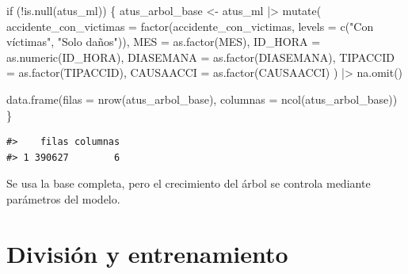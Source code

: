 \documentclass[
  spanish,
  10.5pt,
  letterpaper,
  openany,
  headings=big]{scrbook}
\newenvironment{Shaded}{}{}
\newcommand{\AttributeTok}[1]{\textcolor[rgb]{0.84,0.23,0.29}{#1}}
\newcommand{\ControlFlowTok}[1]{\textcolor[rgb]{0.84,0.23,0.29}{#1}}
\newcommand{\FunctionTok}[1]{\textcolor[rgb]{0.44,0.26,0.76}{#1}}
\newcommand{\NormalTok}[1]{\textcolor[rgb]{0.14,0.16,0.18}{#1}}
\newcommand{\OtherTok}[1]{\textcolor[rgb]{0.44,0.26,0.76}{#1}}
\newcommand{\SpecialCharTok}[1]{\textcolor[rgb]{0.00,0.36,0.77}{#1}}
\newcommand{\StringTok}[1]{\textcolor[rgb]{0.01,0.18,0.38}{#1}}
\begin{document}
\begin{Shaded}
\begin{Highlighting}[]
\ControlFlowTok{if}\NormalTok{ (}\SpecialCharTok{!}\FunctionTok{is.null}\NormalTok{(atus\_ml)) \{}
\NormalTok{  atus\_arbol\_base }\OtherTok{\textless{}{-}}\NormalTok{ atus\_ml }\SpecialCharTok{|\textgreater{}}
    \FunctionTok{mutate}\NormalTok{(}
      \AttributeTok{accidente\_con\_victimas =} \FunctionTok{factor}\NormalTok{(accidente\_con\_victimas, }\AttributeTok{levels =} \FunctionTok{c}\NormalTok{(}\StringTok{"Con víctimas"}\NormalTok{, }\StringTok{"Solo daños"}\NormalTok{)),}
      \AttributeTok{MES =} \FunctionTok{as.factor}\NormalTok{(MES),}
      \AttributeTok{ID\_HORA =} \FunctionTok{as.numeric}\NormalTok{(ID\_HORA),}
      \AttributeTok{DIASEMANA =} \FunctionTok{as.factor}\NormalTok{(DIASEMANA),}
      \AttributeTok{TIPACCID =} \FunctionTok{as.factor}\NormalTok{(TIPACCID),}
      \AttributeTok{CAUSAACCI =} \FunctionTok{as.factor}\NormalTok{(CAUSAACCI)}
\NormalTok{    ) }\SpecialCharTok{|\textgreater{}}
    \FunctionTok{na.omit}\NormalTok{()}

  \FunctionTok{data.frame}\NormalTok{(}\AttributeTok{filas =} \FunctionTok{nrow}\NormalTok{(atus\_arbol\_base), }\AttributeTok{columnas =} \FunctionTok{ncol}\NormalTok{(atus\_arbol\_base))}
\NormalTok{\}}
\end{Highlighting}
\end{Shaded}

\begin{verbatim}
#>    filas columnas
#> 1 390627        6
\end{verbatim}

\begin{tcolorbox}[enhanced jigsaw, arc=.35mm, bottomrule=.15mm, bottomtitle=1mm, breakable, colback=white, colbacktitle=quarto-callout-note-color!10!white, colframe=quarto-callout-note-color-frame, coltitle=black, left=2mm, leftrule=.75mm, opacityback=0, opacitybacktitle=0.6, rightrule=.15mm, title=\textcolor{quarto-callout-note-color}{\faInfo}\hspace{0.5em}{Explicación del código}, titlerule=0mm, toprule=.15mm, toptitle=1mm]

Se usa la base completa, pero el crecimiento del árbol se controla
mediante parámetros del modelo.

\end{tcolorbox}

\section{División y entrenamiento}\label{divisiuxf3n-y-entrenamiento}
\end{document}
